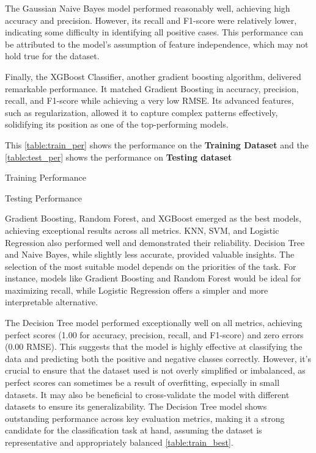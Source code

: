 \documentclass[pdflatex,sn-nature,Numbered]{sn-jnl}%
\theoremstyle{thmstyleone}%
\theoremstyle{thmstyletwo}%
\theoremstyle{thmstylethree}%
\begin{document}
The Gaussian Naive Bayes model performed reasonably well, achieving high accuracy and precision. However, its recall and F1-score were relatively lower, indicating some difficulty in identifying all positive cases. This performance can be attributed to the model’s assumption of feature independence, which may not hold true for the dataset.

Finally, the XGBoost Classifier, another gradient boosting algorithm, delivered remarkable performance. It matched Gradient Boosting in accuracy, precision, recall, and F1-score while achieving a very low RMSE. Its advanced features, such as regularization, allowed it to capture complex patterns effectively, solidifying its position as one of the top-performing models.

This \autoref{table:train_per} shows the performance on the \textbf{Training Dataset} and the \autoref{table:test_per} shows the performance on \textbf{Testing dataset}

\begin{table}[h] 
\caption{Training Performance}  %
\label{table:train_per}
\end{table}

\begin{table}[h] 
\caption{Testing Performance}  %
\label{table:test_per}
\end{table}



 Gradient Boosting, Random Forest, and XGBoost emerged as the best models, achieving exceptional results across all metrics. KNN, SVM, and Logistic Regression also performed well and demonstrated their reliability. Decision Tree and Naive Bayes, while slightly less accurate, provided valuable insights. The selection of the most suitable model depends on the priorities of the task. For instance, models like Gradient Boosting and Random Forest would be ideal for maximizing recall, while Logistic Regression offers a simpler and more interpretable alternative.


The Decision Tree model performed exceptionally well on all metrics, achieving perfect scores (1.00 for accuracy, precision, recall, and F1-score) and zero errors (0.00 RMSE). This suggests that the model is highly effective at classifying the data and predicting both the positive and negative classes correctly. However, it's crucial to ensure that the dataset used is not overly simplified or imbalanced, as perfect scores can sometimes be a result of overfitting, especially in small datasets. It may also be beneficial to cross-validate the model with different datasets to ensure its generalizability. The Decision Tree model shows outstanding performance across key evaluation metrics, making it a strong candidate for the classification task at hand, assuming the dataset is representative and appropriately balanced \autoref{table:train_best}.
\end{document}
